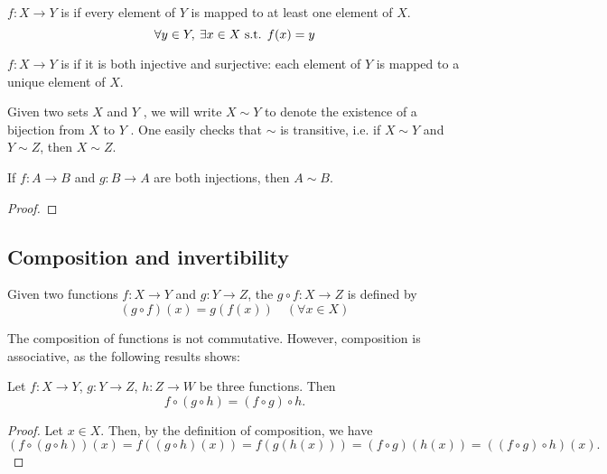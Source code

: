 \begin{definition}[Surjectivity]
$f:X\to Y$ is  if every element of $Y$ is mapped to at least one element of $X$.
\[ \forall y\in Y,\:\exists x\in X \text{ s.t. } f(x)=y \]
\end{definition}

\begin{definition}[Bijectivity]
$f:X\to Y$ is  if it is both injective and surjective: each element of $Y$ is mapped to a unique element of $X$.
\end{definition}

\begin{notation}
Given two sets $X$ and $Y$ , we will write $X\sim Y$ to denote the existence of a bijection from $X$ to $Y$ . One easily checks that $\sim$ is transitive, i.e. if $X\sim Y$ and $Y\sim Z$, then $X\sim Z$.
\end{notation}

\begin{theorem}
If $f:A\to B$ and $g:B\to A$ are both injections, then $A\sim B$.
\end{theorem}

\begin{proof}
\end{proof}
\pagebreak

\subsection{Composition and invertibility}
\begin{definition}[Composition]
Given two functions $f:X\to Y$ and $g:Y\to Z$, the  $g\circ f:X\to Z$ is defined by
\[ (g \circ f)(x)=g(f(x))\quad(\forall x \in X)\]
\end{definition}

The composition of functions is not commutative. However, composition is associative, as the following results shows:

\begin{proposition}[Associativity]
Let $f:X\to Y$, $g:Y\to Z$, $h:Z\to W$ be three functions. Then
\[ f \circ (g \circ h) = (f \circ g) \circ h. \]
\end{proposition}

\begin{proof}
Let $x \in X$. Then, by the definition of composition, we have
\[ (f \circ (g \circ h))(x) = f((g \circ h)(x)) = f(g(h(x))) = (f \circ g)(h(x)) = ((f \circ g) \circ h)(x). \]
\end{proof}

